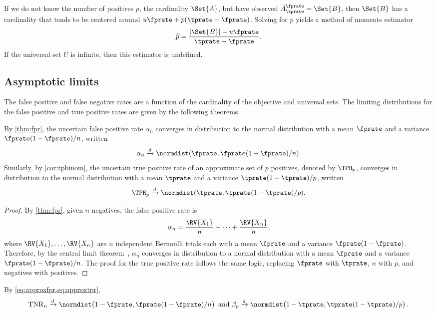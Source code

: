 If we do not know the number of positives $p$, the cardinality $\Set{A}$, but have observed $\tilde{A}^\fprate_\tprate = \Set{B}$, then $\Set{B}$ has a cardinality that tends to be centered around $u \fprate + p (\tprate - \fprate)$.
Solving for $p$ yields a method of moments estimator
\begin{equation}
	\widehat{p} = \frac{|\Set{B}| - u \fprate}{\tprate - \fprate}.
\end{equation}
If the universal set $U$ is infinite, then this estimator is undefined.

\subsection{Asymptotic limits}
\label{sec:asymtotic}
The false positive and false negative rates are a function of the cardinality of the objective and universal sets.
The limiting distributions for the false positive and true positive rates are given by the following theorems.
\begin{theorem}
    \label{thm:approxfpr}
    By \cref{thm:fpr}, the uncertain false positive rate $\alpha_n$ converges in
    distribution to the normal distribution with a mean $\fprate$ and a
    variance $\fprate(1-\fprate)/n$, written
    \begin{equation}
    \label{eq:approxfpr}
	    \alpha_n \xrightarrow{d} \normdist(\fprate, \fprate(1-\fprate) / n).
    \end{equation}
    Similarly, by \cref{cor:tpbinom}, the uncertain true positive rate of an approximate  set of $p$ positives, denoted by $\TPR_p$, converges in distribution to the normal distribution with a mean $\tprate$ and a variance $\tprate(1-\tprate)/p$, written
    \begin{equation}
    \label{eq:approxtpr}
    	\TPR_p \xrightarrow{d} \normdist(\tprate, \tprate(1-\tprate) / p).
    \end{equation}
\end{theorem}
\begin{proof}
    By \cref{thm:fpr}, given $n$ negatives, the false positive rate is
    \begin{equation}
    	\alpha_n = \frac{\RV{X_1}}{n} + \cdots + \frac{\RV{X_n}}{n},
    \end{equation}
    where $\RV{X_1},\ldots,\RV{X_n}$ are $n$ independent Bernoulli trials each with a mean $\fprate$ and a variance $\fprate(1-\fprate)$.
    Therefore, by the central limit theorem~\cite{feller2}, $\alpha_n$ converges in distribution to a normal distribution with a mean $\fprate$  and a variance $\fprate(1-\fprate)/n$.
    The proof for the true positive rate follows the same logic, replacing $\fprate$ with $\tprate$, $n$ with $p$, and negatives with positives.
\end{proof}
By \cref{eq:approxfpr,eq:approxtpr},
\begin{equation}
	\mathrm{TNR}_n \xrightarrow{d} \normdist\!\left(1-\fprate, \fprate(1-\fprate) / n\right) \text{ and } \beta_p \xrightarrow{d} \normdist\!\left(1-\tprate, \tprate(1-\tprate) / p\right).
\end{equation}

